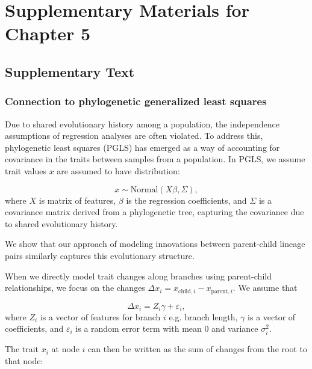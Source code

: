 \graphicspath{{./chapters/ncov-escape/}}

\chapter{Supplementary Materials for Chapter 5}

\section{Supplementary Text}

\subsection*{Connection to phylogenetic generalized least squares}\label{ssec:pgls}


Due to shared evolutionary history among a population, the independence assumptions of regression analyses are often violated.
To address this, phylogenetic least squares (PGLS) has emerged as a way of accounting for covariance in the traits between samples from a population.
In PGLS, we assume trait values $x$ are assumed to have distribution:

\begin{equation}
x \sim \text{Normal}(X \beta,\Sigma),
\end{equation}
where $X$ is matrix of features, $\beta$ is the regression coefficients, and $\Sigma$ is a covariance matrix derived from a phylogenetic tree, capturing the covariance due to shared evolutionary history.

We show that our approach of modeling innovations between parent-child lineage pairs similarly captures this evolutionary structure.

When we directly model trait changes along branches using parent-child relationships, we focus on the changes $\Delta x_i = x_{\text{child}, i} - x_{\text{parent}, i}$. We assume that

\begin{equation}
\Delta x_i = Z_i \gamma + \varepsilon_i,
\end{equation}
where $Z_i$ is a vector of features for branch $i$ e.g. branch length, $\gamma$ is a vector of coefficients, and $\varepsilon_i$ is a random error term with mean 0 and variance $\sigma_i^2$.

The trait $x_i$ at node $i$ can then be written as the sum of changes from the root to that node:

